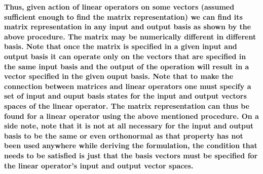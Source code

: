 \documentclass[12pt, oneside]{book}
\theoremstyle{definition}
\theoremstyle{definition}
\theoremstyle{remark}
\begin{document}
\textbf{Thus, given action of linear operators on some vectors (assumed sufficient enough to find the matrix representation) we can find its 
matrix representation in any input and output basis as shown by the above procedure. The matrix may be numerically different in different basis. 
Note that once the matrix is specified in a given input and output basis it can operate only on the vectors that are specified in the same input basis and the 
output of the operation will result in a vector specified in the given ouput basis. Note that to make the connection between matrices and linear operators one must specify
a set of input and ouput basis states for the input and output vectors spaces of the linear operator. The 
matrix representation can thus be found for a linear operator using the above mentioned procedure. On a side note, note that it is not
at all necessary for the input and output basis to be the same or even orthonormal as that property has not been used anywhere while deriving the formulation, the condition that needs to be satisfied is just that the 
basis vectors must be specified for the linear operator's input and output vector spaces.}\\
\end{document}
